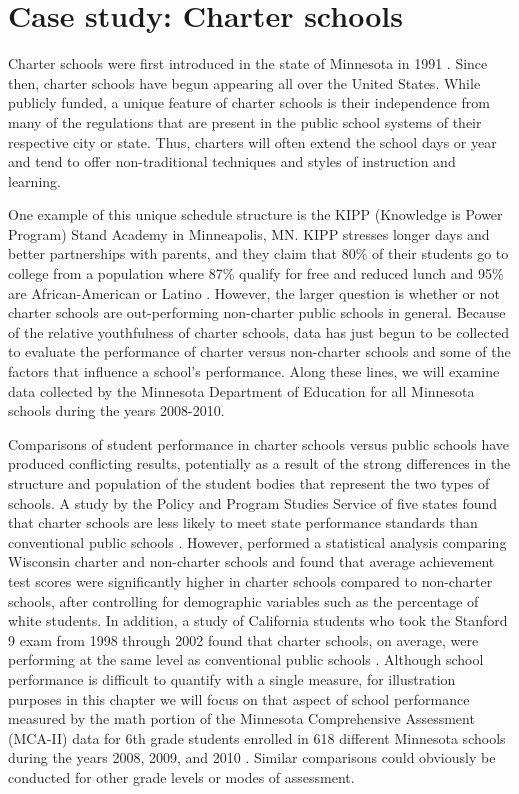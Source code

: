 \documentclass[
]{krantz}
\begin{document}
\hypertarget{cs:charter}{%
\section{Case study: Charter schools}\label{cs:charter}}

Charter schools were first introduced in the state of Minnesota in 1991 \citep{CharterSchools}. Since then, charter schools have begun appearing all over the United States. While publicly funded, a unique feature of charter schools is their independence from many of the regulations that are present in the public school systems of their respective city or state. Thus, charters will often extend the school days or year and tend to offer non-traditional techniques and styles of instruction and learning.

One example of this unique schedule structure is the KIPP (Knowledge is Power Program) Stand Academy in Minneapolis, MN. KIPP stresses longer days and better partnerships with parents, and they claim that 80\% of their students go to college from a population where 87\% qualify for free and reduced lunch and 95\% are African-American or Latino \citep{KIPP}. However, the larger question is whether or not charter schools are out-performing non-charter public schools in general. Because of the relative youthfulness of charter schools, data has just begun to be collected to evaluate the performance of charter versus non-charter schools and some of the factors that influence a school's performance. Along these lines, we will examine data collected by the Minnesota Department of Education for all Minnesota schools during the years 2008-2010.

Comparisons of student performance in charter schools versus public schools have produced conflicting results, potentially as a result of the strong differences in the structure and population of the student bodies that represent the two types of schools. A study by the Policy and Program Studies Service of five states found that charter schools are less likely to meet state performance standards than conventional public schools \citep{Finnigan2004}. However, \citet{Witte2007} performed a statistical analysis comparing Wisconsin charter and non-charter schools and found that average achievement test scores were significantly higher in charter schools compared to non-charter schools, after controlling for demographic variables such as the percentage of white students. In addition, a study of California students who took the Stanford 9 exam from 1998 through 2002 found that charter schools, on average, were performing at the same level as conventional public schools \citep{Buddin2005}. Although school performance is difficult to quantify with a single measure, for illustration purposes in this chapter we will focus on that aspect of school performance measured by the math portion of the Minnesota Comprehensive Assessment (MCA-II) data for 6th grade students enrolled in 618 different Minnesota schools during the years 2008, 2009, and 2010 \citep{MNDepartmentOfEducation}. Similar comparisons could obviously be conducted for other grade levels or modes of assessment.
\end{document}
